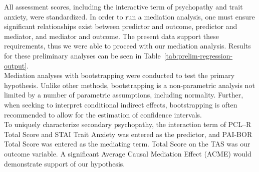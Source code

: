 \documentclass[
  man,floatsintext]{apa7}
\begin{document}
All assessment scores, including the interactive term of psychopathy and trait anxiety, were standardized. In order to run a mediation analysis, one must ensure significant relationships exist between predictor and outcome, predictor and mediator, and mediator and outcome. The present data support these requirements, thus we were able to proceed with our mediation analysis. Results for these preliminary analyses can be seen in Table~\ref{tab:prelim-regression-output}.\\
Mediation analyses with bootstrapping were conducted to test the primary hypothesis. Unlike other methods, bootstrapping is a non-parametric analysis not limited by a number of parametric assumptions, including normality. Further, when seeking to interpret conditional indirect effects, bootstrapping is often recommended to allow for the estimation of confidence intervals.\\
To uniquely characterize secondary psychopathy, the interaction term of PCL--R Total Score and STAI Trait Anxiety was entered as the predictor, and PAI-BOR Total Score was entered as the mediating term. Total Score on the TAS was our outcome variable. A significant Average Causal Mediation Effect (ACME) would demonstrate support of our hypothesis.
\end{document}
